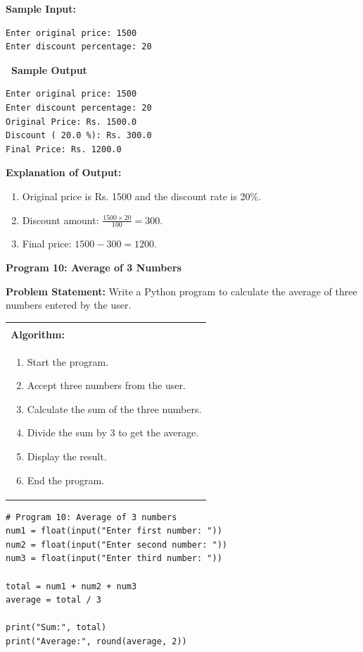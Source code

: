 \documentclass[12pt,a4paper]{article}
\makeatletter
\newcommand{\outhead}{\noindent\colorbox{cmrgreen!25}%
  {\textbf{\small\color{cmrdark}~Sample Output~}}\par\vspace{-1pt}}
\newenvironment{algobox}{%
  \par\vspace{4pt}%
  \noindent\begin{tabular}{@{}p{\linewidth}@{}}%
  \hline\\[-8pt]%
  \textbf{\color{blue!60!black}\small Algorithm:}\\[2pt]%
}{%
  \\[-4pt]\hline%
  \end{tabular}\par\vspace{4pt}%
}
\makeatother
\begin{document}
\textbf{Sample Input:}
\begin{verbatim}
Enter original price: 1500
Enter discount percentage: 20
\end{verbatim}

\outhead
\begin{lstlisting}[style=outputstyle]
Enter original price: 1500
Enter discount percentage: 20
Original Price: Rs. 1500.0
Discount ( 20.0 %): Rs. 300.0
Final Price: Rs. 1200.0
\end{lstlisting}

\textbf{Explanation of Output:}
\begin{enumerate}
  \item Original price is Rs. 1500 and the discount rate is 20\%.
  \item Discount amount: $\frac{1500 \times 20}{100} = 300$.
  \item Final price: $1500 - 300 = 1200$.
\end{enumerate}

\vspace{0.5cm}

\textbf{Program 10: Average of 3 Numbers}

\textbf{Problem Statement:}
Write a Python program to calculate the average of three numbers entered by the user.

\begin{algobox}
\begin{enumerate}[label=Step \arabic*:]
  \item Start the program.
  \item Accept three numbers from the user.
  \item Calculate the sum of the three numbers.
  \item Divide the sum by 3 to get the average.
  \item Display the result.
  \item End the program.
\end{enumerate}
\end{algobox}

\begin{lstlisting}
# Program 10: Average of 3 numbers
num1 = float(input("Enter first number: "))
num2 = float(input("Enter second number: "))
num3 = float(input("Enter third number: "))

total = num1 + num2 + num3
average = total / 3

print("Sum:", total)
print("Average:", round(average, 2))
\end{lstlisting}
\end{document}
